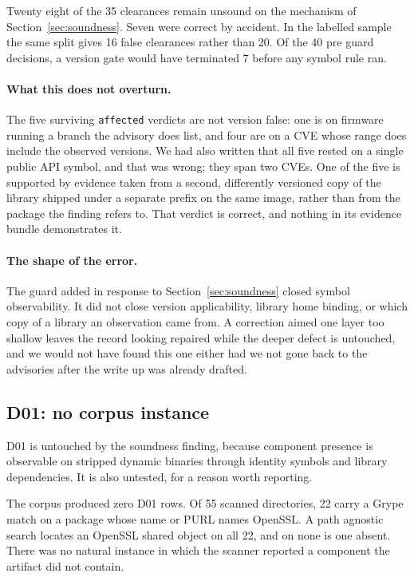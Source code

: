 Twenty eight of the 35 clearances remain unsound on the mechanism of
Section~\ref{sec:soundness}. Seven were correct by accident. In the labelled
sample the same split gives 16 false clearances rather than 20. Of the 40 pre
guard decisions, a version gate would have terminated 7 before any symbol rule
ran.

\paragraph{What this does not overturn.} The five surviving \texttt{affected}
verdicts are not version false: one is on firmware running a branch the advisory
does list, and four are on a CVE whose range does include the observed versions.
We had also written that all five rested on a single public API symbol, and that
was wrong; they span two CVEs. One of the five is supported by evidence taken
from a second, differently versioned copy of the library shipped under a separate
prefix on the same image, rather than from the package the finding refers to.
That verdict is correct, and nothing in its evidence bundle demonstrates it.

\paragraph{The shape of the error.} The guard added in response to
Section~\ref{sec:soundness} closed symbol observability. It did not close
version applicability, library home binding, or which copy of a library an
observation came from. A correction aimed one layer too shallow leaves the
record looking repaired while the deeper defect is untouched, and we would not
have found this one either had we not gone back to the advisories after the
write up was already drafted.

\subsection{D01: no corpus instance}

D01 is untouched by the soundness finding, because component presence is
observable on stripped dynamic binaries through identity symbols and library
dependencies. It is also untested, for a reason worth reporting.

The corpus produced zero D01 rows. Of 55 scanned directories, 22 carry a Grype
match on a package whose name or PURL names OpenSSL. A path agnostic search
locates an OpenSSL shared object on all 22, and on none is one absent. There was
no natural instance in which the scanner reported a component the artifact did
not contain.

